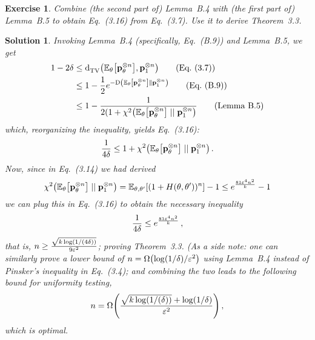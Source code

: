 \documentclass[biber]{nowfnt} %
\newtheorem{question}{Exercise}[chapter]
\newtheorem{solution}{Solution}[chapter]
\newcommand{\exercise}[1]{\marginnote{\textbf{E:} #1}}
\begin{document}
\begin{question}\label{exo:deriving:dep:delta:lb}
Combine (the second part of) Lemma~B.4 with (the first part of) Lemma~B.5 to obtain Eq.~(3.16) from Eq.~(3.7). Use it to derive Theorem~3.3.
\end{question}
\begin{solution}
Invoking Lemma~B.4 (specifically, Eq.~(B.9)) and Lemma~B.5, we get
\begin{align*}
	1-2\errprob 
	&\leq \totalvardist{\bE{\theta}{\p_\theta^{\otimes\ns}}}{\p_\accept^{\otimes\ns}} \tag{Eq.~(3.7)}\\
	&\leq 1-\frac{1}{2}e^{-\kldiv{\bE{\theta}{\p_\theta^{\otimes\ns}}}{\p_\accept^{\otimes\ns}}} \tag{Eq.~(B.9)}\\
	&\leq 1-\frac{1}{2(1+\chisquare{\bE{\theta}{\p_\theta^{\otimes\ns}}}{\p_\accept^{\otimes\ns}}} \tag{Lemma~B.5}
\end{align*}
which, reorganizing the inequality, yields Eq.~(3.16):
\[
	\frac{1}{4\errprob} \leq 1+\chisquare{\bE{\theta}{\p_\theta^{\otimes\ns}}}{\p_\accept^{\otimes\ns}}\,.
\]
Now, since in Eq.~(3.14) we had derived 
\[
	\chisquare{\bE{\theta}{\p_\theta^{\otimes\ns}}}{\p_\accept^{\otimes\ns}}
	= \bE{\theta,\theta'}{(1+{H(\theta,\theta')})^\ns} - 1
	\leq e^{\frac{81\dst^4\ns^2}{\ab}} - 1
\]
we can plug this in Eq.~(3.16) to obtain the necessary inequality 
\begin{equation}
\frac{1}{4\delta} \leq e^{\frac{81\varepsilon^4n^2}{k}}\,,
\end{equation}
that is, $n \geq \frac{ \sqrt{ k \log(1/(4\delta)) } }{ 9\varepsilon^2 }$; proving Theorem~3.3. \emph{(As a side note: one can similarly}\exercise{Try it!} \emph{prove a lower bound of $\ns = \bigOmega{\log(1/\errprob)/\dst^2}$ using Lemma~B.4 instead of Pinsker's inequality in Eq.~(3.4); and combining the two leads to the following bound for uniformity testing, 
\begin{equation}
	\ns = \bigOmega{\frac{ \sqrt{ \ab \log(1/(\errprob)) } + \log(1/\errprob) }{ \dst^2 }}\,,
\end{equation}
which is optimal.}
\end{solution}
\end{document}
